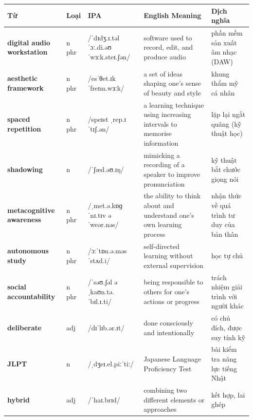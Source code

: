 \vspace{0.8em}
\begin{center}
\renewcommand{\arraystretch}{1.65}
\begin{tabularx}{\textwidth}{|V{0.22\textwidth}|C{0.07\textwidth}|I{0.20\textwidth}|Y|V{0.18\textwidth}|}
\hline
{}
\textbf{Từ} & \textbf{Loại} & \textbf{IPA} & \textbf{English Meaning} & \textbf{Dịch nghĩa} \\
\hline
\textbf{digital audio workstation} & n phr & /ˈdɪdʒ.ɪ.təl ˈɔː.di.əʊ ˈwɜːk.steɪ.ʃən/ & software used to record, edit, and produce audio & phần mềm sản xuất âm nhạc (DAW) \\ \hline
\textbf{aesthetic framework} & n phr & /esˈθet.ɪk ˈfreɪm.wɜːk/ & a set of ideas shaping one's sense of beauty and style & khung thẩm mỹ cá nhân \\ \hline
\textbf{spaced repetition} & n phr & /speɪst ˌrep.ɪˈtɪʃ.ən/ & a learning technique using increasing intervals to memorise information & lặp lại ngắt quãng (kỹ thuật học) \\ \hline
\textbf{shadowing} & n & /ˈʃæd.əʊ.ɪŋ/ & mimicking a recording of a speaker to improve pronunciation & kỹ thuật bắt chước giọng nói \\ \hline
\textbf{metacognitive awareness} & n phr & /ˌmet.ə.kɒɡˈnɪ.tɪv əˈweər.nəs/ & the ability to think about and understand one's own learning process & nhận thức về quá trình tư duy của bản thân \\ \hline
\textbf{autonomous study} & n phr & /ɔːˈtɒn.ə.məs ˈstʌd.i/ & self-directed learning without external supervision & học tự chủ \\ \hline
\textbf{social accountability} & n phr & /ˈsəʊ.ʃəl əˌkaʊn.tə.ˈbɪl.ɪ.ti/ & being responsible to others for one's actions or progress & trách nhiệm giải trình với người khác \\ \hline
\textbf{deliberate} & adj & /dɪˈlɪb.ər.ɪt/ & done consciously and intentionally & có chủ đích, được suy tính kỹ \\ \hline
\textbf{JLPT} & n & /ˌdʒeɪ.el.piːˈtiː/ & Japanese Language Proficiency Test & bài kiểm tra năng lực tiếng Nhật \\ \hline
\textbf{hybrid} & adj & /ˈhaɪ.brɪd/ & combining two different elements or approaches & kết hợp, lai ghép \\ \hline
\end{tabularx}
\end{center}

\partthreeheader

